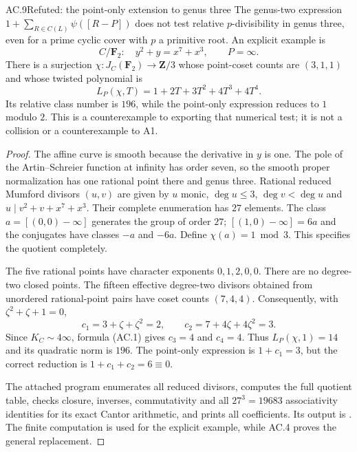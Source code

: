 \begin{claim}{AC.9}{Refuted: the point-only extension to genus three}
The genus-two expression $1+\sum_{R\in C(L)}\psi([R-P])$ does not test
relative $p$-divisibility in genus three, even for a prime cyclic cover
with $p$ a primitive root.  An explicit example is
\[
        C/\mathbf F_2:\quad y^2+y=x^7+x^3,\qquad P=\infty.
\]
There is a surjection $\chi:J_C(\mathbf F_2)\to\mathbf Z/3$ whose
point-coset counts are $(3,1,1)$ and whose twisted polynomial is
\[
                 L_P(\chi,T)=1+2T+3T^2+4T^3+4T^4.
\]
Its relative class number is $196$, while the point-only expression
reduces to $1$ modulo $2$.  This is a counterexample to exporting that
numerical test; it is not a collision or a counterexample to A1.
\end{claim}
\begin{proof}
The affine curve is smooth because the derivative in $y$ is one.
The pole of the Artin--Schreier function at infinity has order seven,
so the smooth proper normalization has one rational point there and
genus three.  Rational reduced Mumford divisors $(u,v)$ are given by
$u$ monic, $\deg u\le3$, $\deg v<\deg u$ and
$u\mid v^2+v+x^7+x^3$.  Their complete enumeration has $27$ elements.
The class $a=[(0,0)-\infty]$ generates the group of order $27$;
$[(1,0)-\infty]=6a$ and the conjugates have classes $-a$ and $-6a$.
Define $\chi(a)=1\bmod3$.  This specifies the quotient completely.

The five rational points have character exponents $0,1,2,0,0$.
There are no degree-two closed points.  The fifteen effective degree-two
divisors obtained from unordered rational-point pairs have coset counts
$(7,4,4)$.  Consequently, with $\zeta^2+\zeta+1=0$,
\[
 c_1=3+\zeta+\zeta^2=2,
       \qquad c_2=7+4\zeta+4\zeta^2=3.
\]
Since $K_C\sim4\infty$, formula (AC.1) gives $c_3=4$ and $c_4=4$.
Thus $L_P(\chi,1)=14$ and its quadratic norm is $196$.
The point-only expression is $1+c_1=3$, but the correct reduction is
$1+c_1+c_2=6\equiv0$.

The attached program  enumerates all reduced
divisors, computes the full quotient table, checks closure, inverses,
commutativity and all $27^3=19683$ associativity identities for its exact
Cantor arithmetic, and prints all coefficients.  Its output is
.  The finite computation is used
for the explicit example, while AC.4 proves the general replacement.
\end{proof}

